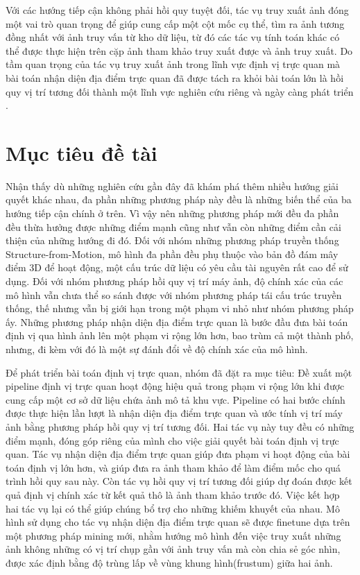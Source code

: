 Với các hướng tiếp cận không phải hồi quy tuyệt đối, tác vụ truy xuất ảnh đóng một vai trò quan trọng để giúp cung cấp một cột mốc cụ thể, tìm ra ảnh tương đồng nhất với ảnh truy vấn từ kho dữ liệu, từ đó các tác vụ tính toán khác có thể được thực hiện trên cặp ảnh tham khảo truy xuất được và ảnh truy xuất. Do tầm quan trọng của tác vụ truy xuất ảnh trong lĩnh vực định vị trực quan mà bài toán nhận diện địa điểm trực quan đã được tách ra khỏi bài toán lớn là hồi quy vị trí tương đối thành một lĩnh vực nghiên cứu riêng và ngày càng phát triển \cite{berton2022rethinking}\cite{keetha2023anyloc}\cite{alibey2023mixvpr}.

\section{Mục tiêu đề tài}

Nhận thấy dù những nghiên cứu gần đây đã khám phá thêm nhiều hướng giải quyết khác nhau, đa phần những phương pháp này đều là những biến thể của ba hướng tiếp cận chính ở trên. Vì vậy nên những phương pháp mới đều đa phần đều thừa hưởng được những điểm mạnh cũng như vẫn còn những điểm cần cải thiện của những hướng đi đó. Đối với nhóm những phương pháp truyền thống Structure-from-Motion, mô hình đa phần đều phụ thuộc vào bản đồ đám mây điểm 3D để hoạt động, một cấu trúc dữ liệu có yêu cầu tài nguyên rất cao để sử dụng. Đối với nhóm phương pháp hồi quy vị trí máy ảnh, độ chính xác của các mô hình vẫn chưa thể so sánh được với nhóm phương pháp tái cấu trúc truyền thống, thế nhưng vẫn bị giới hạn trong một phạm vi nhỏ như nhóm phương pháp ấy. Những phương pháp nhận diện địa điểm trực quan là bước đầu đưa bài toán định vị qua hình ảnh lên một phạm vi rộng lớn hơn, bao trùm cả một thành phố, nhưng, đi kèm với đó là một sự đánh đổi về độ chính xác của mô hình.

Để phát triển bài toán định vị trực quan, nhóm đã đặt ra mục tiêu: Đề xuất một pipeline định vị trực quan hoạt động hiệu quả trong phạm vi rộng lớn khi được cung cấp một cơ sở dữ liệu chứa ảnh mô tả khu vực. Pipeline có hai bước chính được thực hiện lần lượt là nhận diện địa điểm trực quan và ước tính vị trí máy ảnh bằng phương pháp hồi quy vị trí tương đối. Hai tác vụ này tuy đều có những điểm mạnh, đóng góp riêng của mình cho việc giải quyết bài toán định vị trực quan. Tác vụ nhận diện địa điểm trực quan giúp đưa phạm vi hoạt động của bài toán định vị lớn hơn, và giúp đưa ra ảnh tham khảo để làm điểm mốc cho quá trình hồi quy sau này. Còn tác vụ hồi quy vị trí tương đối giúp dự đoán được kết quả định vị chính xác từ kết quả thô là ảnh tham khảo trước đó. Việc kết hợp hai tác vụ lại có thể giúp chúng bổ trợ cho những khiếm khuyết của nhau. Mô hình sử dụng cho tác vụ nhận diện địa điểm trực quan sẽ được finetune dựa trên một phương pháp mining mới, nhằm hướng mô hình đến việc truy xuất những ảnh không những có vị trí chụp gần với ảnh truy vấn mà còn chia sẻ góc nhìn, được xác định bằng độ trùng lấp về vùng khung hình(frustum) giữa hai ảnh.

